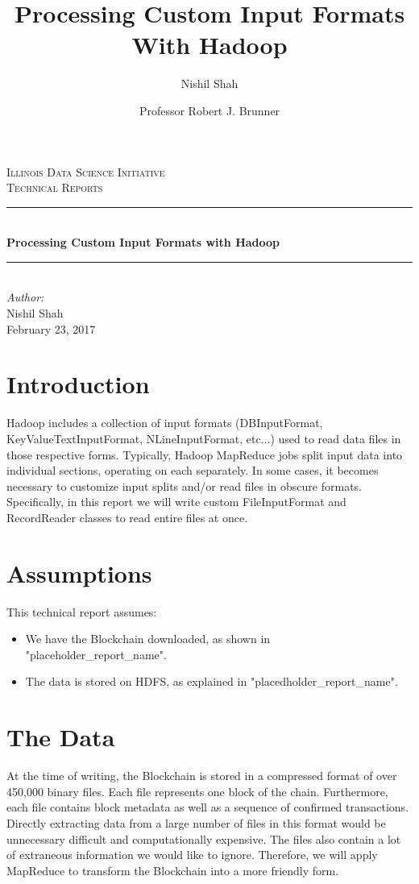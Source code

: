 \documentclass[9pt,twocolumn,twoside]{idsi}
\author[1,3]{Nishil Shah}
\author[2,3]{Professor Robert J. Brunner}
\affil[1]{National Center For Supercomputing Applications (NCSA)}
\affil[2]{Laboratory for Computation, Data, and Machine Learning}
\affil[3]{Illinois Data Science Initiative}
\title{Processing Custom Input Formats With Hadoop}
\newcommand{\HRule}{\rule{\linewidth}{0.5mm}}
\begin{document}
\begin{titlepage}
\center
\textsc{\LARGE Illinois Data Science Initiative}\\[1.5cm]
\textsc{\Large Technical Reports}\\[0.5cm] \HRule \\[0.4cm]
{\huge \bfseries Processing Custom Input Formats with Hadoop } \\[0.4cm] \HRule \\[1.5cm]
\Large \emph{Author:}\\ Nishil Shah \\[3cm]
{\large February 23, 2017}\\[3cm] %
\vfill
\end{titlepage}
%

\maketitle

\section{Introduction}
Hadoop includes a collection of input formats (DBInputFormat, KeyValueTextInputFormat, NLineInputFormat, etc...) used to read data files in those respective forms. Typically, Hadoop MapReduce jobs split input data into individual sections, operating on each separately. In some cases, it becomes necessary to customize input splits and/or read files in obscure formats. Specifically, in this report we will write custom FileInputFormat and RecordReader classes to read entire files at once.

\section{Assumptions}
This technical report assumes:
\begin{itemize}
    \item We have the Blockchain downloaded, as shown in "placeholder\_report\_name".
    \item The data is stored on HDFS, as explained in "placedholder\_report\_name".
\end{itemize}

\section{The Data}
At the time of writing, the Blockchain is stored in a compressed format of over 450,000 binary files. Each file represents one block of the chain. Furthermore, each file contains block metadata as well as a sequence of confirmed transactions. Directly extracting data from a large number of files in this format would be unnecessary difficult and computationally expensive. The files also contain a lot of extraneous information we would like to ignore. Therefore, we will apply MapReduce to transform the Blockchain into a more friendly form.
\end{document}
